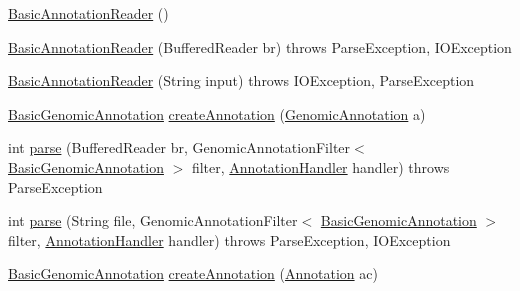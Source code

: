 \begin{DoxyCompactItemize}
\item 
\hyperlink{classbroad_1_1core_1_1annotation_1_1_basic_annotation_reader_a2995e682c5a5e1c94d9412b0490a4e70}{Basic\+Annotation\+Reader} ()
\item 
\hyperlink{classbroad_1_1core_1_1annotation_1_1_basic_annotation_reader_aa5170d3cea9e23df8459377bab2e6682}{Basic\+Annotation\+Reader} (Buffered\+Reader br)  throws Parse\+Exception, I\+O\+Exception 
\item 
\hyperlink{classbroad_1_1core_1_1annotation_1_1_basic_annotation_reader_a3cfa75c056a3bfbe3c6d131e964ce2e0}{Basic\+Annotation\+Reader} (String input)  throws I\+O\+Exception, Parse\+Exception 
\item 
\hyperlink{classbroad_1_1core_1_1annotation_1_1_basic_genomic_annotation}{Basic\+Genomic\+Annotation} \hyperlink{classbroad_1_1core_1_1annotation_1_1_basic_annotation_reader_a055cd4f511c7044a3a078d5ab5261e73}{create\+Annotation} (\hyperlink{interfacebroad_1_1core_1_1annotation_1_1_genomic_annotation}{Genomic\+Annotation} a)
\item 
int \hyperlink{classbroad_1_1core_1_1annotation_1_1_basic_annotation_reader_acfb8de6c90893fefde837322f53f86f9}{parse} (Buffered\+Reader br, Genomic\+Annotation\+Filter$<$ \hyperlink{classbroad_1_1core_1_1annotation_1_1_basic_genomic_annotation}{Basic\+Genomic\+Annotation} $>$ filter, \hyperlink{interfacebroad_1_1core_1_1annotation_1_1_annotation_handler}{Annotation\+Handler} handler)  throws Parse\+Exception 
\item 
int \hyperlink{classbroad_1_1core_1_1annotation_1_1_basic_annotation_reader_a95deec640fb1968c7e98a14c9a2bc348}{parse} (String file, Genomic\+Annotation\+Filter$<$ \hyperlink{classbroad_1_1core_1_1annotation_1_1_basic_genomic_annotation}{Basic\+Genomic\+Annotation} $>$ filter, \hyperlink{interfacebroad_1_1core_1_1annotation_1_1_annotation_handler}{Annotation\+Handler} handler)  throws Parse\+Exception, I\+O\+Exception 
\item 
\hyperlink{classbroad_1_1core_1_1annotation_1_1_basic_genomic_annotation}{Basic\+Genomic\+Annotation} \hyperlink{classbroad_1_1core_1_1annotation_1_1_basic_annotation_reader_acfd320987e51841554395a70294a065c}{create\+Annotation} (\hyperlink{interfaceumms_1_1core_1_1annotation_1_1_annotation}{Annotation} ac)
\end{DoxyCompactItemize}


